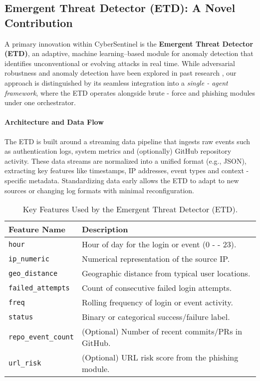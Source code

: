 \documentclass{article}
\begin{document}
\subsection{Emergent Threat Detector (ETD): A Novel Contribution}
A primary innovation within CyberSentinel is the \textbf{Emergent Threat Detector (ETD)}, an adaptive, machine learning–based module for anomaly detection that identifies unconventional or evolving attacks in real time. While adversarial robustness and anomaly detection have been explored in past research \cite{papernot2016limitations, buczak2016survey}, our approach is distinguished by its seamless integration into a \emph{single - agent framework}, where the ETD operates alongside brute - force and phishing modules under one orchestrator.

\paragraph{Architecture and Data Flow}
The ETD is built around a streaming data pipeline that ingests raw events such as authentication logs, system metrics and (optionally) GitHub repository activity. These data streams are normalized into a unified format (e.g., JSON), extracting key features like timestamps, IP addresses, event types and context - specific metadata. Standardizing data early allows the ETD to adapt to new sources or changing log formats with minimal reconfiguration.

\begin{table}[ht]
\centering
\caption{Key Features Used by the Emergent Threat Detector (ETD).}
\label{tab:etd - features}
\renewcommand{\arraystretch}{1.2} %
\begin{tabular}{p{3.3cm} p{8.5cm}}
\hline
\textbf{Feature Name} & \textbf{Description} \\
\hline
\texttt{hour} & Hour of day for the login or event (0 -  - 23). \\
\texttt{ip\_numeric} & Numerical representation of the source IP. \\
\texttt{geo\_distance} & Geographic distance from typical user locations. \\
\texttt{failed\_attempts} & Count of consecutive failed login attempts. \\
\texttt{freq} & Rolling frequency of login or event activity. \\
\texttt{status} & Binary or categorical success/failure label. \\
\texttt{repo\_event\_count} & (Optional) Number of recent commits/PRs in GitHub. \\
\texttt{url\_risk} & (Optional) URL risk score from the phishing module. \\
\hline
\end{tabular}
\end{table}
\end{document}
